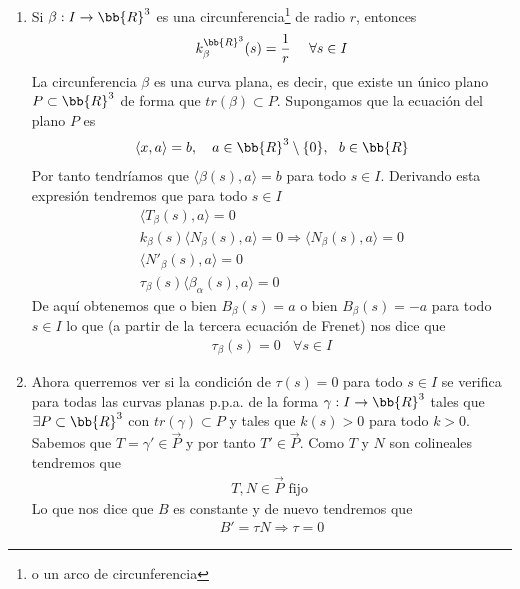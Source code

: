 \begin{ejercicio}
\begin{enumerate}
        \item Si $\beta : I \to \bb{R}^3$ es una circunferencia\footnote{o un arco de circunferencia} de radio $r$, entonces 
        \begin{gather*}
            k_\beta^{\bb{R}^3}(s) = \frac{1}{r} \ \ \ \ \forall s \in I
        \end{gather*}
        La circunferencia $\beta$ es una curva plana, es decir, que existe un único plano $P\subset \bb{R}^3$ de forma que $tr(\beta)\subset P$. Supongamos que la ecuación del plano $P$ es 
        \begin{gather*}
            \langle x, a \rangle = b ,\ \ \ a\in \bb{R
            }^3\setminus\{0\},\ \ b\in \bb{R}
        \end{gather*}
        Por tanto tendríamos que $\langle \beta(s), a \rangle = b$ para todo $s\in I$. Derivando esta expresión tendremos que para todo $s\in I$
        \begin{gather*}
            \langle T_\beta(s), a\rangle = 0\\
            k_\beta(s)\langle N_\beta(s), a \rangle = 0 \Rightarrow \langle N_\beta(s), a \rangle = 0\\
            \langle N'_\beta(s), a \rangle = 0\\
            \tau_\beta(s) \langle \beta_\alpha(s),a \rangle = 0
        \end{gather*}
        De aquí obtenemos que o bien $B_\beta(s) = a$ o bien $B_\beta(s) = -a$ para todo $s\in I$ lo que (a partir de la tercera ecuación de Frenet) nos dice que 
        \begin{gather*}
            \tau_\beta(s) = 0 \ \ \ \ \forall s \in I
        \end{gather*}

        \item Ahora querremos ver si la condición de $\tau(s)=0$ para todo $s\in I$ se verifica para todas las curvas planas p.p.a. de la forma $\gamma:I \to \bb{R}^3$ tales que $\exists P \subset \bb{R}^3$ con $tr(\gamma)\subset P$ y tales que $k(s)>0$ para todo $k>0$. \\
         
        Sabemos que $T = \gamma'\in \vec{P}$ y por tanto $T'\in \vec{P}$. Como $T$ y $N$ son colineales tendremos que 
        \begin{gather*}
            T,N\in \vec{P} \text{ fijo }
        \end{gather*}
        Lo que nos dice que $B$ es constante y de nuevo tendremos que 
        \begin{gather*}
            B' = \tau N \Rightarrow \tau = 0
        \end{gather*}


\end{enumerate}
\end{ejercicio}

